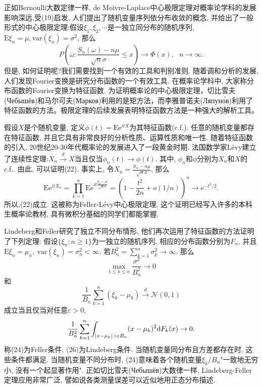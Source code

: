 \documentclass[a4paper,AutoFakeBold,oneside,12pt]{article}
\begin{document}
正如Bernoulli大数定律一样, de Moivre-Laplace中心极限定理对概率论学科的发展影响深远,受(19)启发, 人们提出了随机变量序列依分布收敛的概念, 并给出了一般形式的中心极限定理:假设$\xi_1,\xi_2,\cdots$是一独立同分布的随机序列,$\mathrm{E}\xi_n = \mu,\mathrm{var}(\xi_n) = \sigma^2$, 那么
\begin{equation}
	P\left( \omega:\frac{S_n(\omega)-n\mu}{\sqrt{n}\sigma}\leqslant x \right) \to \Phi(x),~~~n\to\infty.
\end{equation}
但是, 如何证明呢?我们需要找到一个有效的工具和判别准则. 随着调和分析的发展, 人们发现Fourier变换是研究分布函数的一个有效工具. 在概率论学科中, 大家称分布函数的Fourier变换为特征函数. 为证明概率论的中心极限定理，切比雪夫(Чебышёв)和马尔可夫(Марков)利用的是矩方法，而李雅普诺夫(Ляпуно́в)利用了特征函数的方法。极限定理的后续发展表明特征函数方法是一种强大的解析工具。

假设$X$是个随机变量, 定义$\phi(t) = \mathrm{E}\mathrm{e}^{itX}$为其特征函数(c.f.). 任意的随机变量都存在特征函数, 并且它具有非常良好的分析性质、运算性质和唯一性. 随着特征函数的引入, 20世纪20-30年代概率论的发展进入了一段黄金时期. 法国数学家Lévy建立了连续性定理:$X_n\stackrel{d}{\rightarrow}X$当且仅当$\phi_n(t)\to\phi(t)$. 其中, $\phi_n$和$\phi$分别为$X_n$和$X$的c.f.. 由此, 可以证明(22). 事实上, 令$X_n = \frac{S_n-n\mu}{\sqrt{n}\sigma}$, 那么
\begin{equation}
        \mathrm{E}\mathrm{e}^{itX_n} =\prod_{k=1}^n\mathrm{E}\mathrm{e}^{it\frac{\xi_k-\mu}{\sqrt{n}\sigma}}
        =\left( 1-\frac{t^2}{2n}+o(1/n) \right)^n
        \to \mathrm{e}^{-t^2/2}.
\end{equation}
所以,(22)成立. 这被称为Feller-Lévy中心极限定理, 这个证明已经写入许多的本科生概率论教材, 具有微积分基础的同学们都能掌握.

Lindeberg和Feller研究了独立不同分布情形, 他们再次运用了特征函数的方法证明了下列定理: 假设$\{\xi_n;n\geqslant 1\}$为一独立的随机序列, 相应的分布函数分别为$F_n$, 并且$\mathrm{E}\xi_n = \mu_n,~\mathrm{var}(\xi_n) = \sigma^2_n<\infty$. 若$B_n^2 = \sum_{k=1}^{n}\sigma_k^2\to\infty$. 那么
\begin{equation}
    \max_{1\leqslant k\leqslant n} \frac{\sigma^2}{B_n^2}\to 0
\end{equation}
和\begin{equation}
    \frac{1}{B_n}\sum_{k=1}^n(\xi_k-\mu_k)\stackrel{d}{\rightarrow}\mathcal{N}(0,1)
\end{equation}
成立当且仅当对任意$\varepsilon>0$,
\begin{equation}
    \frac{1}{B_n^2}\sum_{k=1}^n\int_{\abs{x-\mu_k}>\varepsilon B_n}(x-\mu_k)^2\mathrm{d}F_k(x)\to 0.
\end{equation}
称(24)为Feller条件, (26)为Lindeberg条件.  当随机变量同分布且方差都存在时, 这些条件都满足. 当随机变量不同分布时, (24)意味着各个随机变量$\xi_k/B_n$"一致地无穷小, 没有一个起显著作用". 正如切比雪夫(Чебышёв)大数律一样, Lindeberg-Feller定理应用非常广泛, 譬如说各类测量误差可以近似地用正态分布描述.
\end{document}
